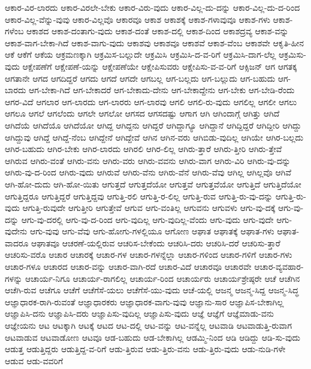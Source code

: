 {ಆಕಾರ-ವಿರ-ಲಾರದು
ಆಕಾರ-ವಿರಲೇ-ಬೇಕು
ಆಕಾರ-ವಿರು-ವುದು
ಆಕಾರ-ವಿಲ್ಲ-ದು-ದನ್ನು
ಆಕಾರ-ವಿಲ್ಲ-ದು-ದ-ರಿಂದ
ಆಕಾರ-ವಿಲ್ಲ-ವೆನ್ನು-ವುವು
ಆಕಾರ-ವಿಲ್ಲವೊ
ಆಕಾರವೂ
ಆಕಾಶ
ಆಕಾಶಕ್ಕೆ
ಆಕಾಶ-ಗಳಾವುವೂ
ಆಕಾಶ-ಗಳು
ಆಕಾಶ-ಗಳೆಂಬ
ಆಕಾಶದ
ಆಕಾಶ-ದಂತಾಗು-ವುದು
ಆಕಾಶ-ದಂತೆ
ಆಕಾಶ-ದಲ್ಲಿ
ಆಕಾಶ-ದಿಂದ
ಆಕಾಶದ್ರವ್ಯ
ಆಕಾಶ-ವನ್ನು
ಆಕಾಶ-ವಾಗ-ಬೇಕಾ-ಗಿದೆ
ಆಕಾಶ-ವಾಗು-ವುದು
ಆಕಾಶವು
ಆಕಾಶವೂ
ಆಕಾಶವೆ
ಆಕಾಶ-ವೆಂಬ
ಆಕಾಶವೇ
ಆಕೃತಿ-ಹೀನ
ಆಕೆ
ಆಕೆಗೆ
ಆಕೆಯ
ಆಕ್ರಮಣಕ್ಕಾಗಿ
ಆಕ್ರಮಿಸ-ಬಲ್ಲುದೇ
ಆಕ್ರಮಿಸಿ
ಆಕ್ರಮಿಸಿ-ದ-ವ-ರಿಗೆ
ಆಕ್ರಮಿಸಿ-ದಾಗ-ಲೆಲ್ಲ
ಆಕ್ರಮಿಸು-ವುದು
ಆಕ್ಷೇಪಣೆಗೆ
ಆಕ್ಷೇಪಣೆ-ಯನ್ನು
ಆಕ್ಷೇಪಣೆಯೇ
ಆಕ್ಷೇಪಿಸುವರು
ಆಕ್ಷೇಪಿಸು-ವ-ವ-ರಿಗೆ
ಆಕ್ಸಿಜನ್
ಆಗ
ಆಗತಕ್ಕ
ಆಗತಾನೇ
ಆಗದ
ಆಗದಿದ್ದರೆ
ಆಗದು
ಆಗದೆ
ಆಗದೇ
ಆಗಬಲ್ಲ
ಆಗ-ಬಲ್ಲದು
ಆಗ-ಬಲ್ಲುದು
ಆಗ-ಬಹುದು
ಆಗ-ಬಾರದು
ಆಗ-ಬೇಕಾ-ಗಿದೆ
ಆಗ-ಬೇಕಾದರೆ
ಆಗ-ಬೇಕಾದು-ದೇನು
ಆಗ-ಬೇಕಾದ್ದೇನು
ಆಗ-ಬೇಕು
ಆಗ-ಬೇಡಿ-ರೆಂದು
ಆಗರ-ವಿದೆ
ಆಗಲಾರ
ಆಗ-ಲಾರದು
ಆಗ-ಲಾರರು
ಆಗ-ಲಾರವು
ಆಗಲಿ
ಆಗಲಿ-ರು-ವುದು
ಆಗಲಿಲ್ಲ
ಆಗಲೀ
ಆಗಲು
ಆಗಲೂ
ಆಗಲೆ
ಆಗಲೆಂದು
ಆಗಲೇ
ಆಗಲೋ
ಆಗಸದ
ಆಗಸದಷ್ಟು
ಆಗಾಗ
ಆಗಿ
ಆಗಿಂದಾಗ್ಗೆ
ಆಗಿತ್ತು
ಆಗಿದೆ
ಆಗಿದೆಯೆ
ಆಗಿದೆಯೊ
ಆಗಿದೆಯೋ
ಆಗಿದ್ದ
ಆಗಿದ್ದನು
ಆಗಿದ್ದರೆ
ಆಗಿದ್ದಾಗ್ಯೂ
ಆಗಿದ್ದಾನೆ
ಆಗಿದ್ದಿದ್ದರೆ
ಆಗಿದ್ದೀರಿ
ಆಗಿದ್ದು
ಆಗಿದ್ದುವು
ಆಗಿದ್ದೆ
ಆಗಿದ್ದೆ-ನೆಂಬ
ಆಗಿದ್ದೇನೆ
ಆಗಿದ್ದೇವೆ
ಆಗಿನ
ಆಗಿನ-ವರು
ಆಗಿಬಿಡು-ವುದಿಲ್ಲ
ಆಗಿಯೇ
ಆಗಿರ-ಬಲ್ಲದು
ಆಗಿರ-ಬಹುದು
ಆಗಿರ-ಬೇಕು
ಆಗಿರ-ಲಾರದು
ಆಗಿರಲಿ
ಆಗಿರ-ಲಿಲ್ಲ
ಆಗಿರು-ತ್ತಾರೆ
ಆಗಿರು-ತ್ತೀರಿ
ಆಗಿರು-ತ್ತೇವೆ
ಆಗಿರುವ
ಆಗಿರು-ವಂತೆ
ಆಗಿರು-ವನು
ಆಗಿರು-ವರು
ಆಗಿರು-ವವನು
ಆಗಿರು-ವಾಗ
ಆಗಿರು-ವಿರಿ
ಆಗಿರು-ವು-ದನ್ನು
ಆಗಿರು-ವು-ದ-ರಿಂದ
ಆಗಿರು-ವುದು
ಆಗಿರುವೆ
ಆಗಿರು-ವೆನು
ಆಗಿರು-ವೆನೆ
ಆಗಿರು-ವೆವು
ಆಗಿಲ್ಲ
ಆಗಿಲ್ಲವೊ
ಆಗಿವೆ
ಆಗಿ-ಹೋ-ದುದು
ಆಗಿ-ಹೋ-ಯಿತು
ಆಗುತ್ತದೆ
ಆಗುತ್ತದೆಯೋ
ಆಗುತ್ತವೆ
ಆಗುತ್ತವೆಯೋ
ಆಗುತ್ತಿದೆ
ಆಗುತ್ತಿದೆಯೋ
ಆಗುತ್ತಿದ್ದರೂ
ಆಗುತ್ತಿದ್ದರೆ
ಆಗುತ್ತಿದ್ದವು
ಆಗುತ್ತಿ-ರಲಿ
ಆಗುತ್ತಿ-ರ-ಲಿಲ್ಲ
ಆಗುತ್ತಿ-ರುವ
ಆಗುತ್ತಿ-ರು-ವು-ದನ್ನು
ಆಗುತ್ತಿ-ರು-ವುದು
ಆಗುತ್ತಿ-ರುವುದೇ
ಆಗುತ್ತೀರಿ
ಆಗುತ್ತೇವೆ
ಆಗುವ
ಆಗು-ವಂತಿಲ್ಲ
ಆಗುವನು
ಆಗುವಳು
ಆಗು-ವು-ದಕ್ಕೆ
ಆಗು-ವು-ದನ್ನು
ಆಗು-ವು-ದರಲ್ಲಿ
ಆಗು-ವು-ದ-ರಿಂದ
ಆಗು-ವುದಿಲ್ಲ
ಆಗು-ವುದಿಲ್ಲ-ವೆಂದು
ಆಗು-ವುದು
ಆಗು-ವುದೇ
ಆಗು-ವುದೇನು
ಆಗು-ವುವು
ಆಗು-ವೆವು
ಆಗು-ಹೋಗು-ಗಳಲ್ಲಿಯೂ
ಆಗೋಣ
ಆಘಾತ
ಆಘಾತಕ್ಕೆ
ಆಘಾತ-ಗಳು
ಆಘಾತ-ವಾದರೂ
ಆಘಾತವೂ
ಆಚರಣೆ-ಯಲ್ಲಿರುವ
ಆಚರಿಸ-ಬೇಕೆಂದು
ಆಚರಿಸಿ-ದರು
ಆಚರಿಸಿ-ದರೆ
ಆಚರಿಸು-ತ್ತಾರೆ
ಆಚರಿಸು-ವರೊ
ಆಚಾರ
ಆಚಾರಕ್ಕೆ
ಆಚಾರ-ಗಳ
ಆಚಾರ-ಗಳನ್ನೆಲ್ಲಾ
ಆಚಾರ-ಗಳಿಂದ
ಆಚಾರ-ಗಳಿಗೆ
ಆಚಾರ-ಗಳು
ಆಚಾರ-ಗಳೂ
ಆಚಾರದ
ಆಚಾರ-ವನ್ನು
ಆಚಾರ-ವಾಗಿ-ರದೆ
ಆಚಾರ-ವಿದೆ
ಆಚಾರವೂ
ಆಚಾರವೇ
ಆಚಾರ-ವ್ಯವಹಾರ-ಗಳನ್ನು
ಆಚಾರ್ಯ-ನಿಗೂ
ಆಚಾರ್ಯ-ರಾಗಲಿಲ್ಲ
ಆಚಾರ್ಯ-ರಿಂದ
ಆಚಾರ್ಯರು
ಆಚಾರ್ಯಶ್ರೇಷ್ಠರೇ
ಆಚೆ
ಆಚೆಗಿನ
ಆಚೆಗಿ-ರುವ
ಆಚೆಗೂ
ಆಚೆಗೆ
ಆಚೆಗೆಸೆ-ಯಲು
ಆಚೆಗೆಸೆ-ಯು-ವುದು
ಆಚೆ-ಯಲ್ಲಿ
ಆಜನ್ಮ
ಆಜನ್ಮ-ಸಿದ್ದ
ಆಜನ್ಮ-ಸಿದ್ಧ
ಆಜ್ಞಾಧಾರಕ-ರಾಗಿ-ರುವಂತೆ
ಆಜ್ಞಾಧಾರಕರು
ಆಜ್ಞಾಧಾರಕ-ವಾಗು-ವುವು
ಆಜ್ಞಾನು-ಸಾರ
ಆಜ್ಞಾಪಿಸ-ಬೇಕಾಗಿಲ್ಲ
ಆಜ್ಞಾಪಿಸಿ-ದನು
ಆಜ್ಞಾಪಿಸಿ-ದರು
ಆಜ್ಞಾಪಿಸು-ವುದಿಲ್ಲ
ಆಜ್ಞಾಪಿಸು-ವುದು
ಆಜ್ಞೆ
ಆಜ್ಞೆಗೆ
ಆಜ್ಞೆಮಾಡು-ವನು
ಆಜ್ಞೇಯನು
ಆಟ
ಆಟಕ್ಕಾಗಿ
ಆಟಕ್ಕೆ
ಆಟದ
ಆಟ-ದಲ್ಲಿ
ಆಟ-ವನ್ನು
ಆಟ-ವನ್ನೆಲ್ಲ
ಆಟವಾಡಿ
ಆಟವಾಡುತ್ತಿ-ರುವಾಗ
ಆಟವಾಡುವ
ಆಟವಾಡೋಣ
ಆಟವೂ
ಆಡ-ಬಹುದು
ಆಡ-ಬೇಕಾಗಿಲ್ಲ
ಆಡಮ್ಮಿ-ನಿಂದ
ಆಡಿ
ಆಡಿದ್ದು
ಆಡಿ-ಸು-ವುದು
ಆಡುತ್ತ
ಆಡುತ್ತಿದ್ದರು
ಆಡುತ್ತಿದ್ದ-ವ-ರಿಗೆ
ಆಡು-ತ್ತಿರುವ
ಆಡು-ತ್ತಿರು-ವನು
ಆಡು-ತ್ತಿರು-ವುದು
ಆಡು-ನುಡಿ-ಗಳೇ
ಆಡುವ
ಆಡು-ವವರಿಗೆ
}
